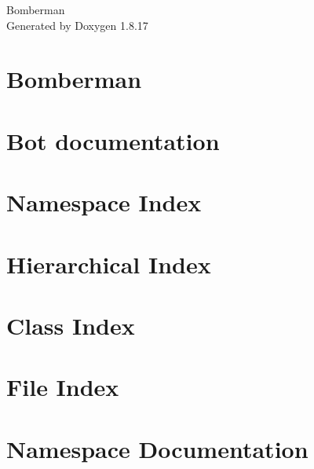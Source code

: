 \let\mypdfximage\pdfximage\def\pdfximage{\immediate\mypdfximage}\documentclass[twoside]{book}
\newcommand{\+}{\discretionary{\mbox{\scriptsize$\hookleftarrow$}}{}{}}
\newcommand{\clearemptydoublepage}{%
  \newpage{\pagestyle{empty}\cleardoublepage}%
}
\begin{document}
\hypersetup{pageanchor=false,
             bookmarksnumbered=true,
             pdfencoding=unicode
            }
\begin{titlepage}
\vspace*{7cm}
\begin{center}%
{\Large Bomberman }\\
\vspace*{1cm}
{\large Generated by Doxygen 1.8.17}\\
\end{center}
\end{titlepage}
\clearemptydoublepage
{}
\tableofcontents
\clearemptydoublepage
{}
\hypersetup{pageanchor=true}

\chapter{Bomberman}
\label{index}\hypertarget{index}{}
\chapter{Bot documentation}
\label{md_Bot}

\chapter{Namespace Index}

\chapter{Hierarchical Index}

\chapter{Class Index}

\chapter{File Index}

\chapter{Namespace Documentation}













\end{document}

